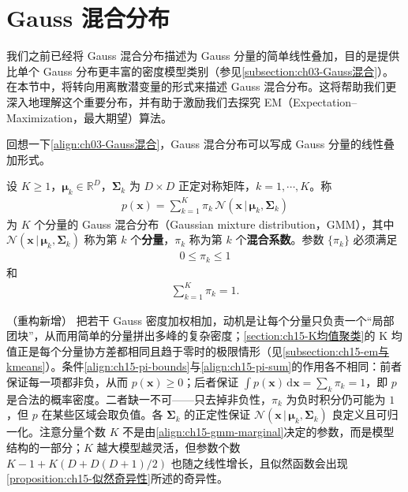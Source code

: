 \documentclass[../../main.tex]{subfiles}
\begin{document}
\section{Gauss 混合分布}\label{section:ch15-Gauss混合分布}

我们之前已经将 Gauss 混合分布描述为 Gauss 分量的简单线性叠加，目的是提供比单个 Gauss 分布更丰富的密度模型类别（参见\cref{subsection:ch03-Gauss混合}）。在本节中，将转向用离散潜变量的形式来描述 Gauss 混合分布。这将帮助我们更深入地理解这个重要分布，并有助于激励我们去探究 EM（Expectation--Maximization，最大期望）算法。

回想一下\eqref{align:ch03-Gauss混合}，Gauss 混合分布可以写成 Gauss 分量的线性叠加形式。

\begin{definition}\label{definition:ch15-Gauss混合分布}
设 $K\geqslant1$，$\bm{\mu}_k\in\mathbb{R}^{D}$，$\bm{\Sigma}_k$ 为 $D\times D$ 正定对称矩阵，$k=1,\cdots,K$。称
\begin{align}
p(\bm{x})=\sum_{k=1}^{K}\pi_k\,\mathcal{N}(\bm{x}\,|\,\bm{\mu}_k,\bm{\Sigma}_k)
\label{align:ch15-gmm-marginal}
\end{align}
为 $K$ 个分量的 Gauss 混合分布（Gaussian mixture distribution，GMM），其中 $\mathcal{N}(\bm{x}\,|\,\bm{\mu}_k,\bm{\Sigma}_k)$ 称为第 $k$ 个\textbf{分量}，$\pi_k$ 称为第 $k$ 个\textbf{混合系数}。参数 $\{\pi_k\}$ 必须满足
\begin{align}
0\leqslant\pi_k\leqslant1
\label{align:ch15-pi-bounds}
\end{align}
和
\begin{align}
\sum_{k=1}^{K}\pi_k=1.
\label{align:ch15-pi-sum}
\end{align}
\end{definition}

\begin{remark}（重构新增）
把若干 Gauss 密度加权相加，动机是让每个分量只负责一个“局部团块”，从而用简单的分量拼出多峰的复杂密度；\cref{section:ch15-K均值聚类}的 K 均值正是每个分量协方差都相同且趋于零时的极限情形（见\cref{subsection:ch15-em与kmeans}）。条件\eqref{align:ch15-pi-bounds}与\eqref{align:ch15-pi-sum}的作用各不相同：前者保证每一项都非负，从而 $p(\bm{x})\geqslant0$；后者保证 $\int p(\bm{x})\,\mathrm{d}\bm{x}=\sum_k\pi_k=1$，即 $p$ 是合法的概率密度。二者缺一不可——只去掉非负性，$\pi_k$ 为负时积分仍可能为 $1$，但 $p$ 在某些区域会取负值。各 $\bm{\Sigma}_k$ 的正定性保证 $\mathcal{N}(\bm{x}\,|\,\bm{\mu}_k,\bm{\Sigma}_k)$ 良定义且可归一化。注意分量个数 $K$ 不是由\eqref{align:ch15-gmm-marginal}决定的参数，而是模型结构的一部分；$K$ 越大模型越灵活，但参数个数 $K-1+K(D+D(D+1)/2)$ 也随之线性增长，且似然函数会出现\cref{proposition:ch15-似然奇异性}所述的奇异性。
\end{remark}
\end{document}
